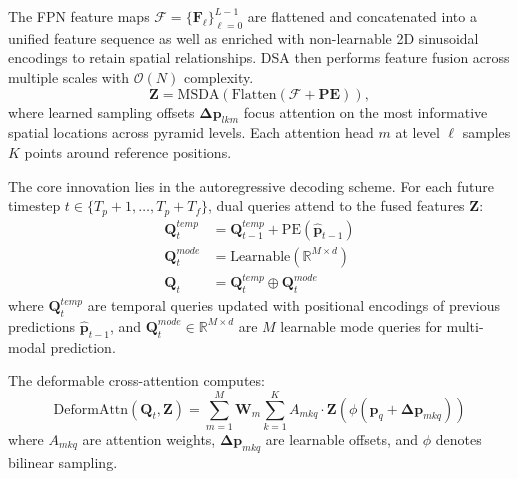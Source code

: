 \begin{description}[leftmargin=1em,itemsep=2pt]
\begin{description}[leftmargin=1em,itemsep=2pt]
\item[Deformable Self-Attention (DSA).] The FPN feature maps \(\boldsymbol{\mathcal{F}} = \{\mathbf{F}_\ell\}_{\ell=0}^{L-1}\) are flattened and concatenated into a unified feature sequence as well as enriched with non-learnable 2D sinusoidal encodings to retain spatial relationships. DSA then performs feature fusion across multiple scales with \(\mathcal{O}(N)\) complexity.
\begin{equation}
\label{eq:msda_fusion}
\mathbf{Z} = \text{MSDA}(\text{Flatten}(\boldsymbol{\boldsymbol{\mathcal{F}} + \text{PE}})),
\end{equation}
where learned sampling offsets \(\boldsymbol{\Delta p}_{lkm}\) focus attention on the most informative spatial locations across pyramid levels. Each attention head \(m\) at level \(\ell\) samples \(K\) points around reference positions.

\item[Recurrent deformable cross-attention.] The core innovation lies in the autoregressive decoding scheme. For each future timestep \(t \in \{T_p + 1, \ldots, T_p + T_f\}\), dual queries attend to the fused features \(\mathbf{Z}\):
\begin{equation}
\label{eq:dual_query_update}
\begin{aligned}
\mathbf{Q}_t^{temp} &= \mathbf{Q}_{t-1}^{temp} + \text{PE}(\hat{\mathbf{p}}_{t-1}) \\
\mathbf{Q}_t^{mode} &= \text{Learnable}(\mathbb{R}^{M \times d}) \\
\mathbf{Q}_t &= \mathbf{Q}_t^{temp} \oplus \mathbf{Q}_t^{mode}
\end{aligned}
\end{equation}
where \(\mathbf{Q}_t^{temp}\) are temporal queries updated with positional encodings of previous predictions \(\hat{\mathbf{p}}_{t-1}\), and \(\mathbf{Q}_t^{mode} \in \mathbb{R}^{M \times d}\) are \(M\) learnable mode queries for multi-modal prediction.

The deformable cross-attention computes:
\begin{equation}
\label{eq:deformable_cross_attention}
\text{DeformAttn}(\mathbf{Q}_t, \mathbf{Z}) = \sum_{m=1}^{M} \mathbf{W}_m \sum_{k=1}^{K} A_{mkq} \cdot \mathbf{Z}(\phi(\mathbf{p}_q + \boldsymbol{\Delta p}_{mkq}))
\end{equation}
where \(A_{mkq}\) are attention weights, \(\boldsymbol{\Delta p}_{mkq}\) are learnable offsets, and \(\phi\) denotes bilinear sampling.


\end{description}
\end{description}
